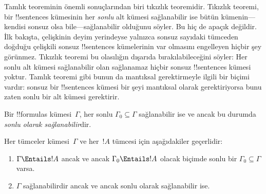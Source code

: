 

      {}
      {}


Tamlık teoreminin önemli sonuçlarından biri tıkızlık teoremidir.
Tıkızlık teoremi, bir !!{sentence}s kümesinin her \emph{sonlu} alt
kümesi sağlanabilir ise bütün kümenin---kendisi sonsuz olsa
bile---sağlanabilir olduğunu söyler. Bu hiç de apaçık değildir. İlk
bakışta, çelişkinin deyim yerindeyse yalnızca sonsuz sayıdaki tümceden
doğduğu çelişkili sonsuz !!{sentence}s kümelerinin var olmasını
engelleyen hiçbir şey görünmez. Tıkızlık teoremi bu olasılığın dışarıda
bırakılabileceğini söyler: Her sonlu alt kümesi sağlanabilir olan
sağlanamaz hiçbir sonsuz !!{sentence}s kümesi yoktur. Tamlık teoremi
gibi bunun da mantıksal gerektirmeyle ilgili bir biçimi vardır: sonsuz
bir !!{sentence}s kümesi bir şeyi mantıksal olarak gerektiriyorsa bunu
zaten sonlu bir alt kümesi gerektirir.

\begin{defn}
  Bir !!{formula}s kümesi~$\Gamma$, her sonlu
  $\Gamma_0\subseteq\Gamma$ sağlanabilir ise ve ancak bu durumda
  \emph{sonlu olarak sağlanabilir}dir.
\end{defn}

\begin{thm}
Her tümceler kümesi~$\Gamma$ ve her~$!A$ tümcesi için aşağıdakiler
geçerlidir:
\begin{enumerate}
  \item $\Gamma\Entails !A$ ancak ve ancak $\Gamma_0\Entails !A$
    olacak biçimde sonlu bir $\Gamma_0\subseteq\Gamma$ varsa.
  \item $\Gamma$ sağlanabilirdir ancak ve ancak sonlu olarak
    sağlanabilir ise.
\end{enumerate}
\end{thm}

